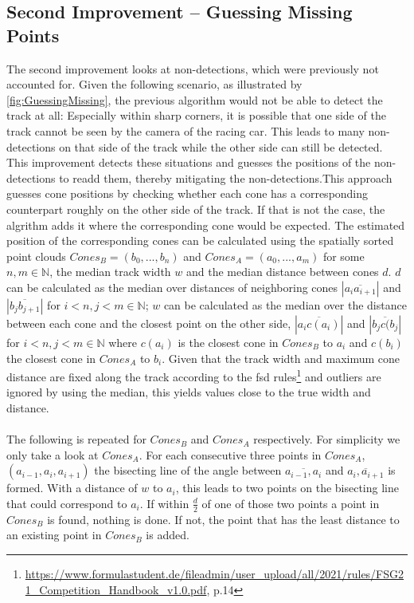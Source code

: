 \subsection{Second Improvement – Guessing Missing Points}
The second improvement looks at non-detections, which were previously not accounted for. Given the following scenario, as illustrated by \ref{fig:GuessingMissing}, the previous algorithm would not be able to detect the track at all: Especially within sharp corners, it is possible that one side of the track cannot be seen by the camera of the racing car. This leads to many non-detections on that side of the track while the other side can still be detected. This improvement detects these situations and guesses the positions of the non-detections to readd them, thereby mitigating the non-detections.This approach guesses cone positions by checking whether each cone has a corresponding counterpart roughly on the other side of the track. If that is not the case, the algrithm adds it where the corresponding cone would be expected. The estimated position of the corresponding cones can be calculated using the spatially sorted point clouds $Cones_B = (b_0,...,b_n)$ and $Cones_A = (a_0,...,a_m)$ for some $n,m \in \mathbb{N}$, the median track width $w$ and the median distance between cones $d$. $d$ can be calculated as the median over distances of neighboring cones $|\overline{a_i a_{i+1}}|$ and $|\overline{b_j b_{j+1}}|$ for $i<n,j<m \in \mathbb{N}$; $w$ can be calculated as the median over the distance between each cone and the closest point on the other side, $|\overline{a_i c(a_{i})}|$ and $|\overline{b_j c(b_{j}}|$ for $i<n,j<m \in \mathbb{N}$ where $c(a_i)$ is the closest cone in $Cones_B$ to $a_i$ and $c(b_i)$ the closest cone in $Cones_A$ to $b_i$. Given that the track width and maximum cone distance are fixed along the track according to the \ac{fsd} rules\footnote{\url{https://www.formulastudent.de/fileadmin/user_upload/all/2021/rules/FSG21_Competition_Handbook_v1.0.pdf}, p.14} and outliers are ignored by using the median, this yields values close to the true width and distance.\\
\\The following is repeated for $Cones_B$ and $Cones_A$ respectively. For simplicity we only take a look at $Cones_A$. For each consecutive three points in $Cones_A$, $(a_{i-1},a_{i},a_{i+1})$ the bisecting line of the angle between $\overline{a_{i-1},a_{i}}$ and $\overline{a_{i},a_{i+1}}$ is formed. With a distance of $w$ to $a_{i}$, this leads to two points on the bisecting line that could correspond to  $a_{i}$. If within $\frac{d}{2}$ of one of those two points a point in $Cones_B$ is found, nothing is done. If not,  the point that has the least distance to an existing point in $Cones_B$ is added. \\
